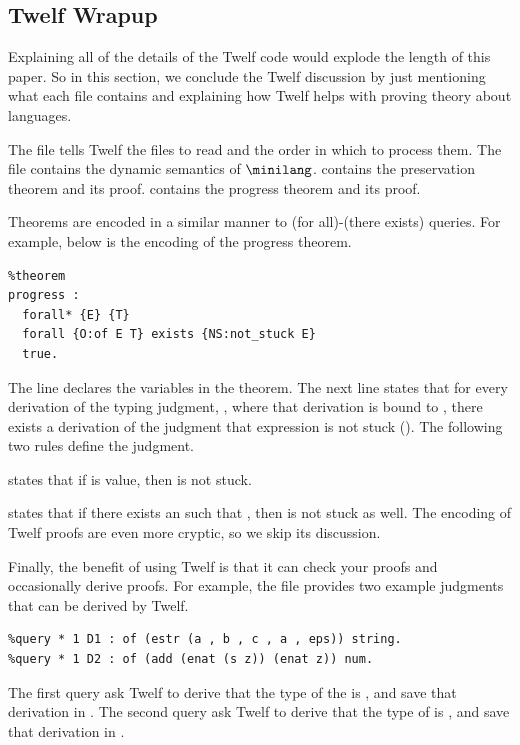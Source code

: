 \subsection{Twelf Wrapup}
Explaining all of the details of the Twelf code would
explode the length of this paper.
So in this section, we conclude the Twelf discussion by
just mentioning what each file contains and explaining
how Twelf helps with proving theory about languages.

The  file tells Twelf the files to read
and the order in which to process them.
The  file contains the dynamic semantics
of $\minilang$.
 contains the preservation theorem
and its proof.
 contains the progress theorem
and its proof.

Theorems are encoded in a similar manner to
(for all)-(there exists) queries.
For example, below is the encoding of the progress theorem.

\begin{verbatim}
%theorem  
progress :
  forall* {E} {T}
  forall {O:of E T} exists {NS:not_stuck E}
  true.
\end{verbatim}

The  line declares the variables in the theorem.
The next line states that for every derivation of the typing judgment,
, where that derivation is bound to , there
exists a derivation of the judgment that expression  is
not stuck ().
The following two rules define the  judgment.

 states that if
 is value, then  is not stuck.

 states that if
there exists an  such that ,
then  is not stuck as well.
The encoding of Twelf proofs are even more cryptic, so we skip its
discussion.

Finally, the benefit of using Twelf is that it can
check your proofs and occasionally derive proofs.
For example, the file  provides two
example judgments that can be derived by Twelf.

\begin{verbatim}
%query * 1 D1 : of (estr (a , b , c , a , eps)) string.
%query * 1 D2 : of (add (enat (s z)) (enat z)) num.
\end{verbatim}

The first query ask Twelf to derive that the type of
the  is ,
and save that derivation in .
The second query ask Twelf to derive that the
type of  is ,
and save that derivation in .

